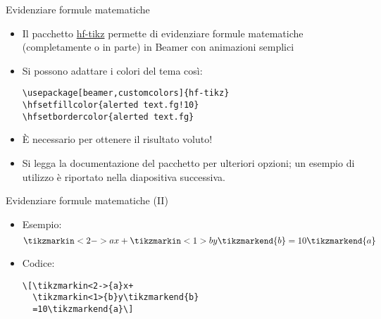 \documentclass{beamer}
\begin{document}
\begin{frame}[fragile]{Evidenziare formule matematiche}
\begin{itemize}
\item Il pacchetto \href{http://www.ctan.org/pkg/hf-tikz}{hf-tikz} permette di evidenziare formule matematiche (completamente o in parte) in Beamer con animazioni semplici 
\item Si possono adattare i colori del tema così:
\begin{verbatim}
\usepackage[beamer,customcolors]{hf-tikz}
\hfsetfillcolor{alerted text.fg!10}
\hfsetbordercolor{alerted text.fg}
\end{verbatim}
\item È necessario  per ottenere il risultato voluto!
\item Si legga la documentazione del pacchetto per ulteriori opzioni; un esempio di utilizzo è riportato nella diapositiva successiva.
\end{itemize}
\end{frame}

\begin{frame}[fragile]{Evidenziare formule matematiche (II)}
\begin{itemize}
\item Esempio:
\[\tikzmarkin<2->{a}x+\tikzmarkin<1>{b}y\tikzmarkend{b}=10\tikzmarkend{a}\]
\item<2-> Codice:
\begin{verbatim}
\[\tikzmarkin<2->{a}x+
  \tikzmarkin<1>{b}y\tikzmarkend{b}
  =10\tikzmarkend{a}\]
\end{verbatim}
\end{itemize}
\end{frame}


\end{document}
